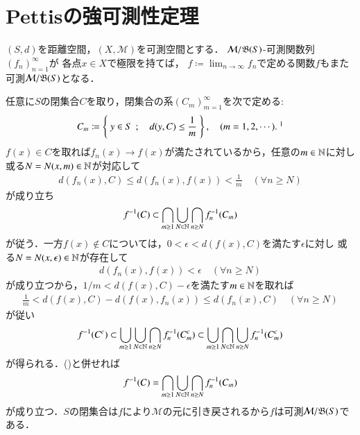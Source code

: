 \section{Pettisの強可測性定理}
	\begin{screen}
		\begin{lem}[距離空間値の可測関数列の極限は可測]
			$(S,d)$を距離空間，$(X,\mathcal{M})$を可測空間とする．
			$\mathcal{M}/\mathfrak{B}(S)$-可測関数列$(f_n)_{n=1}^{\infty}$が
			各点$x \in X$で極限を持てば，
			$f \coloneqq \lim_{n \to \infty} f_n$で定める関数$f$もまた可測$\mathcal{M}/\mathfrak{B}(S)$となる．
			\label{lem:measurability_metric_space}
		\end{lem}
	\end{screen}
	
	\begin{prf}
		任意に$S$の閉集合$C$を取り，閉集合の系$(C_m)_{m=1}^{\infty}$を次で定める:
		\begin{align}
			C_m \coloneqq \Set{y \in S}{d(y,C) \leq \frac{1}{m}}, \quad (m=1,2,\cdots).\ \footnotemark
		\end{align}
		\footnotetext{
			$S \ni y \longmapsto d(y,C) \in [0,\infty)$は連続であるから，
			閉集合$[0,1/m]$は$S$の閉集合に引き戻される．
		}
		$f(x) \in C$を取れば$f_n(x) \longrightarrow f(x)$が満たされているから，任意の$m \in \mathbb{N}$に対し或る$N = N(x,m) \in \mathbb{N}$が対応して
		\begin{align}
			d\left( f_n(x),C \right) \leq d\left( f_n(x),f(x) \right) < \frac{1}{m}
			\quad (\forall n \geq N)
		\end{align}
		が成り立ち
		\begin{align}
			f^{-1}(C) \subset \bigcap_{m \geq 1} \bigcup_{N \in \mathbb{N}} \bigcap_{n \geq N} f_n^{-1}(C_m)
			\label{eq:lem_measurability_metric_space}
		\end{align}
		が従う．一方$f(x) \notin C$については，$0 < \epsilon < d(f(x),C)$を満たす$\epsilon$に対し
		或る$N = N(x,\epsilon) \in \mathbb{N}$が存在して
		\begin{align}
			d\left( f_n(x), f(x) \right) < \epsilon
			\quad (\forall n \geq N)
		\end{align}
		が成り立つから，$1/m < d(f(x),C) - \epsilon$を満たす$m \in \mathbb{N}$を取れば
		\begin{align}
			\frac{1}{m} < d(f(x),C) - d(f(x),f_n(x)) \leq d(f_n(x),C)
			\quad (\forall n \geq N)
		\end{align}
		が従い
		\begin{align}
			f^{-1}(C^c) \subset \bigcup_{m \geq 1} \bigcup_{N \in \mathbb{N}} \bigcap_{n \geq N} f_n^{-1}(C_m^c)
			\subset \bigcup_{m \geq 1} \bigcap_{N \in \mathbb{N}} \bigcup_{n \geq N} f_n^{-1}(C_m^c)
		\end{align}
		が得られる．()と併せれば
		\begin{align}
			f^{-1}(C) = \bigcap_{m \geq 1} \bigcup_{N \in \mathbb{N}} \bigcap_{n \geq N} f_n^{-1}(C_m)
		\end{align}
		が成り立つ．$S$の閉集合は$f$により$\mathcal{M}$の元に引き戻されるから$f$は可測$\mathcal{M}/\mathfrak{B}(S)$である．
		\QED
	\end{prf}
